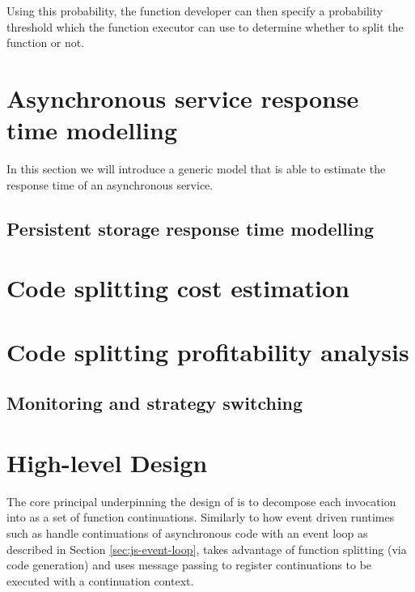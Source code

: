 Using this probability, the function developer can then specify a probability threshold which the function executor can use to determine whether to split the function or not.

\section{Asynchronous service response time modelling}
\label{sec:faas-async-service-response-time-modelling}
In this section we will introduce a generic model that is able to estimate the response time of an asynchronous service.

\subsection{Persistent storage response time modelling}

\section{Code splitting cost estimation}

\section{Code splitting profitability analysis}
\label{sec:faas-code-splitting-profitability}

\subsection{Monitoring and strategy switching}

\section{High-level Design}
The core principal underpinning the design of \faaas{} is to decompose each \faas{} invocation into as a set of function continuations. Similarly to how event driven runtimes such as \js{} handle continuations of asynchronous code with an event loop as described in Section \ref{sec:js-event-loop}, \faaas{} takes advantage of function splitting (via code generation) and uses message passing to register continuations to be executed with a continuation context.

